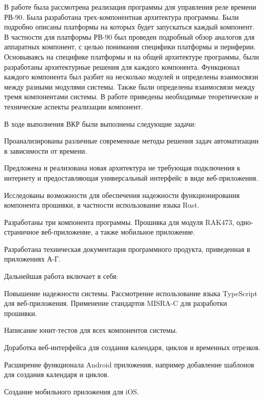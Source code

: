 В работе была рассмотрена реализация программы для управления реле времени РВ-90. Была разработана трех-компонентная архитектура программы. Были подробно описаны платформы на которых будет запускаться каждый компонент. В частности для платформы РВ-90 был проведен подробный обзор аналогов для аппаратных компонент, с целью понимания специфики платформы и периферии. Основываясь на специфике платформы и на общей архитектуре программы, были разработаны архитектурные решения для каждого компонента. Функционал каждого компонента был разбит на несколько модулей и определены взаимосвязи между разными модулями системы. Также были определены взаимосвязи между тремя компонентами системы.
В  работе приведены необходимые теоретические и технические аспекты реализации компонент. 

В ходе выполнения ВКР были выполнены следующие задачи: 
\begin{my_enumerate}
\item Проанализированы различные современные методы решения задач автоматизации в зависимости от времени.
\item Предложена и реализована новая архитектура не требующая подключения к интернету и предоставляющая универсальный интерфейс в виде веб-приложения.
\item Исследованы возможности для обеспечения надежности функционирования компонента прошивки, в частности использование языка Rust. 
\item Разработаны три компонента программы. Прошивка для модуля RAK473, одно-страничное веб-приложение, а также мобильное приложение. 
\item Разработана  техническая  документация  программного  продукта,  приведенная  в приложениях А-Г.
\end{my_enumerate}

Дальнейшая работа включает в себя: 
\begin{my_enumerate}
\item Повышение надежности системы. Рассмотрение использование языка TypeScript для веб-приложения. Применение стандартов MISRA-C для разработки прошивки.
\item Написание юнит-тестов для всех компонентов системы.
\item Доработка веб-интерфейса для создания календаря, циклов и временных отрезков.
\item Расширение функционала Android приложения, например добавление шаблонов для создания календаря и циклов.
\item Создание мобильного приложения для iOS.
\end{my_enumerate}







